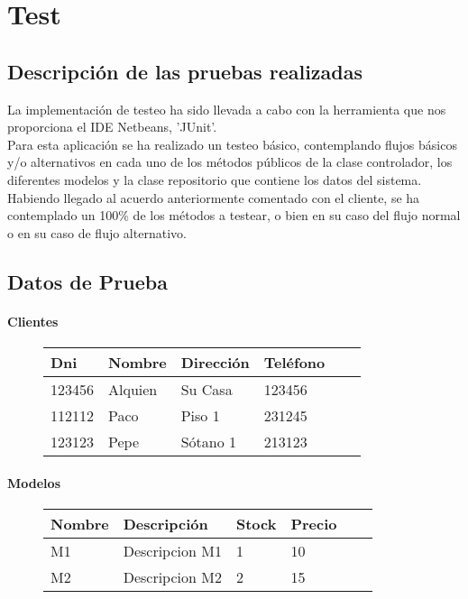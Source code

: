 \newpage{\pagestyle{empty}\cleardoublepage}
\chapter{Test}

\section{Descripci\'{o}n de las pruebas realizadas}

La implementaci\'{o}n de testeo ha sido llevada a cabo con la herramienta que nos proporciona el IDE Netbeans, 'JUnit'.\\

Para esta aplicaci\'{o}n se ha realizado un testeo b\'{a}sico, contemplando flujos b\'{a}sicos y/o alternativos en cada uno de los m\'{e}todos p\'{u}blicos de la clase controlador, los diferentes modelos y la clase repositorio que contiene los datos del sistema.\\

Habiendo llegado al acuerdo anteriormente comentado con el cliente, se ha contemplado un 100\% de los m\'{e}todos a testear, o bien en su caso del flujo normal o en su caso de flujo alternativo.\\


\section{Datos de Prueba}

\subsubsection{Clientes}
\begin{figure}[h]
\begin{center}
\begin{tabular}{l*{4}{l}l}
Dni & Nombre & Direcci\'{o}n & Tel\'{e}fono \\
\hline
123456 & Alquien & Su Casa & 123456   \\
112112 & Paco & Piso 1 & 231245  \\
123123 & Pepe & S\'{o}tano 1 & 213123 \\
\end{tabular}
\end{center}
\end{figure}
\subsubsection{Modelos}
\begin{figure}[h]
\begin{center}
\begin{tabular}{l*{4}{l}l}
Nombre & Descripci\'{o}n & Stock & Precio \\
\hline
M1 & Descripcion M1 & 1 & 10   \\
M2 & Descripcion M2 & 2 & 15  \\
\end{tabular}
\end{center}
\end{figure}
